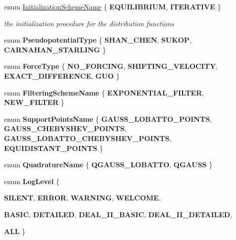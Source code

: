 \begin{DoxyCompactItemize}
enum \hyperlink{namespacenatrium_a5aad7d448441836f9c631c505cf8cd54}{InitializationSchemeName} \{ {\bfseries EQUILIBRIUM}, 
{\bfseries ITERATIVE}
 \}
\begin{DoxyCompactList}\small\item\em the initialization procedure for the distribution functions \item\end{DoxyCompactList}\item 
enum {\bfseries PseudopotentialType} \{ {\bfseries SHAN\_\-CHEN}, 
{\bfseries SUKOP}, 
{\bfseries CARNAHAN\_\-STARLING}
 \}
\item 
enum {\bfseries ForceType} \{ {\bfseries NO\_\-FORCING}, 
{\bfseries SHIFTING\_\-VELOCITY}, 
{\bfseries EXACT\_\-DIFFERENCE}, 
{\bfseries GUO}
 \}
\item 
enum {\bfseries FilteringSchemeName} \{ {\bfseries EXPONENTIAL\_\-FILTER}, 
{\bfseries NEW\_\-FILTER}
 \}
\item 
enum {\bfseries SupportPointsName} \{ {\bfseries GAUSS\_\-LOBATTO\_\-POINTS}, 
{\bfseries GAUSS\_\-CHEBYSHEV\_\-POINTS}, 
{\bfseries GAUSS\_\-LOBATTO\_\-CHEBYSHEV\_\-POINTS}, 
{\bfseries EQUIDISTANT\_\-POINTS}
 \}
\item 
enum {\bfseries QuadratureName} \{ {\bfseries QGAUSS\_\-LOBATTO}, 
{\bfseries QGAUSS}
 \}
\item 
enum {\bfseries LogLevel} \{ \par
{\bfseries SILENT}, 
{\bfseries ERROR}, 
{\bfseries WARNING}, 
{\bfseries WELCOME}, 
\par
{\bfseries BASIC}, 
{\bfseries DETAILED}, 
{\bfseries DEAL\_\-II\_\-BASIC}, 
{\bfseries DEAL\_\-II\_\-DETAILED}, 
\par
{\bfseries ALL}
 \}
\end{DoxyCompactItemize}

